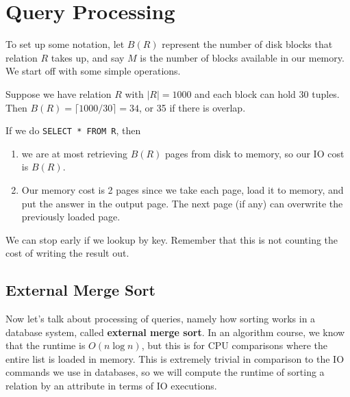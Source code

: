 \documentclass{article}
\begin{document}
\section{Query Processing}

    To set up some notation, let $B(R)$ represent the number of disk blocks that relation $R$ takes up, and say $M$ is the number of blocks available in our memory. We start off with some simple operations. 

    \begin{example}
      Suppose we have relation $R$ with $|R| = 1000$ and each block can hold 30 tuples. Then $B(R) = \lceil 1000 / 30 \rceil = 34$, or 35 if there is overlap. 
    \end{example}

    \begin{example}
      If we do \texttt{SELECT * FROM R}, then 
      \begin{enumerate}
        \item we are at most retrieving $B(R)$ pages from disk to memory, so our IO cost is $B(R)$. 
        \item Our memory cost is 2 pages since we take each page, load it to memory, and put the answer in the output page. The next page (if any) can overwrite the previously loaded page. 
      \end{enumerate}
      We can stop early if we lookup by key. Remember that this is not counting the cost of writing the result out. 
    \end{example}

  \subsection{External Merge Sort}

    Now let's talk about processing of queries, namely how sorting works in a database system, called \textbf{external merge sort}. In an algorithm course, we know that the runtime is $O(n \log{n})$, but this is for CPU comparisons where the entire list is loaded in memory. This is extremely trivial in comparison to the IO commands we use in databases, so we will compute the runtime of sorting a relation by an attribute in terms of IO executions. 
\end{document}
